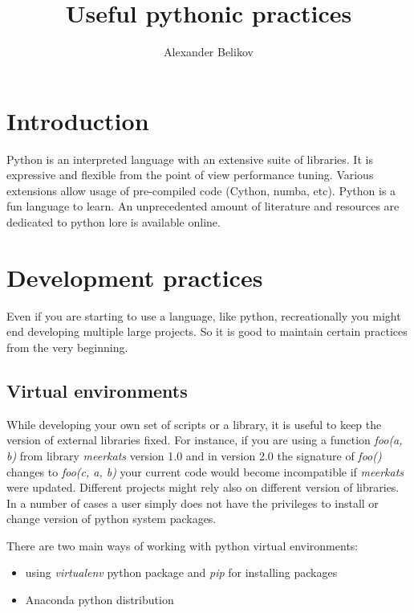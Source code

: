 \documentclass[article]{revtex4}
\begin{document}

\title{Useful pythonic practices}
\author{Alexander Belikov}

\maketitle


\section{Introduction}
Python is an interpreted language with an extensive suite of libraries. It is expressive and flexible from the point of view performance tuning. Various extensions allow usage of pre-compiled code (Cython, numba, etc).
Python is a fun language to learn. An unprecedented amount of literature and resources are dedicated to python lore is available online.

\section{Development practices}
Even if you are starting to use a language, like python, recreationally you might end developing multiple large projects. So it is good to maintain certain practices from the very beginning.


\subsection{Virtual environments}
While developing your own set of scripts or a library, it is useful to keep the version of external libraries fixed.
For instance, if you are using a function {\it foo(a, b)} from library {\it meerkats} version 1.0 and in version 2.0 the signature of {\it foo()} changes to {\it foo(c, a, b)} your current code would become incompatible if {\it meerkats} were updated.
Different projects might rely also on different version of libraries.
In a number of cases a user simply does not have the privileges to install or change version of python system packages.

There are two main ways of working with python virtual environments:
\begin{itemize}
    \item using {\it virtualenv} python package and {\it pip} for installing packages
    \item Anaconda python distribution
\end{itemize}
\end{document}
